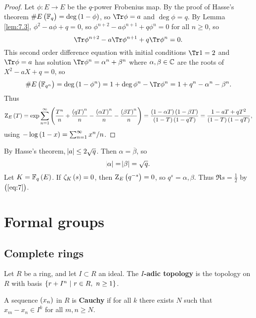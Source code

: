 \begin{proof}
Let $ \phi : E \to E $ be the $ q $-power Frobenius map. By the proof of Hasse's theorem $ \#E\br{\FF_q} = \deg \br{1 - \phi} $, so $ \Tr \phi = a $ and $ \deg \phi = q $. By Lemma \ref{lem:7.3}, $ \phi^2 - a\phi + q = 0 $, so $ \phi^{n + 2} - a\phi^{n + 1} + q\phi^n = 0 $ for all $ n \ge 0 $, so
$$ \Tr \phi^{n + 2} - a\Tr \phi^{n + 1} + q\Tr \phi^n = 0. $$
This second order difference equation with initial conditions $ \Tr 1 = 2 $ and $ \Tr \phi = a $ has solution $ \Tr \phi^n = \alpha^n + \beta^n $ where $ \alpha, \beta \in \mathbb{C} $ are the roots of $ X^2 - aX + q = 0 $, so
$$ \#E\br{\FF_{q^n}} = \deg \br{1 - \phi^n} = 1 + \deg \phi^n - \Tr \phi^n = 1 + q^n - \alpha^n - \beta^n. $$
Thus
$$ \Z_E\br{T} = \exp \sum_{n = 1}^\infty \br{\dfrac{T^n}{n} + \dfrac{\br{qT}^n}{n} - \dfrac{\br{\alpha T}^n}{n} - \dfrac{\br{\beta T}^n}{n}} = \dfrac{\br{1 - \alpha T}\br{1 - \beta T}}{\br{1 - T}\br{1 - qT}} = \dfrac{1 - aT + qT^2}{\br{1 - T}\br{1 - qT}}, $$
using $ -\log \br{1 - x} = \sum_{n = 1}^\infty x^n / n $.
\end{proof}

\begin{remark*}
By Hasse's theorem, $ \abs{a} \le 2\sqrt{q} $. Then $ \alpha = \overline{\beta} $, so
\begin{equation}
\label{eq:7}
\abs{\alpha} = \abs{\beta} = \sqrt{q}.
\end{equation}
Let $ K = \FF_q\br{E} $. If $ \zeta_K\br{s} = 0 $, then $ \Z_E\br{q^{-s}} = 0 $, so $ q^s = \alpha, \beta $. Thus $ \Re s = \tfrac{1}{2} $ by $ \br{\ref{eq:7}} $.
\end{remark*}

\pagebreak

\section{Formal groups}

\subsection{Complete rings}

\begin{definition*}
Let $ R $ be a ring, and let $ I \subset R $ an ideal. The \textbf{$ I $-adic topology} is the topology on $ R $ with basis $ \cbr{r + I^n \st r \in R, \ n \ge 1} $.
\end{definition*}

\begin{definition*}
A sequence $ \br{x_n} $ in $ R $ is \textbf{Cauchy} if for all $ k $ there exists $ N $ such that $ x_m - x_n \in I^k $ for all $ m, n \ge N $.
\end{definition*}

